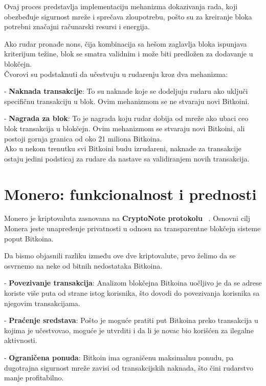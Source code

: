 \documentclass[12pt,a4paper]{article}
\begin{document}
Ovaj proces predstavlja implementaciju mehanizma dokazivanja rada, koji obezbeđuje sigurnost mreže i sprečava zloupotrebu, pošto su za kreiranje bloka potrebni značajni računarski resursi i energija.

Ako rudar pronađe nons, čija kombinacija sa hešom zaglavlja bloka ispunjava kriterijum težine, blok se smatra validnim i može biti predložen za dodavanje u blokčejn.\\

Čvorovi su podstaknuti da učestvuju u rudarenju kroz dva mehanizma:

    -	\textbf{Naknada transakcije}: To su naknade koje se dodeljuju rudaru ako uključi specifičnu transakciju u blok. Ovim mehanizmom se ne stvaraju novi Bitkoini.
    
    -	\textbf{Nagrada za blok}: To je nagrada koju rudar dobija od mreže ako ubaci ceo blok transakcija u blokčejn. Ovim mehanizmom se stvaraju novi Bitkoini, ali postoji gornja granica od oko 21 miliona Bitkoina.\\
    
Ako u nekom trenutku svi Bitkoini budu izrudareni, naknade za transakcije ostaju jedini podsticaj za rudare da nastave sa validiranjem novih transakcija.


\newpage
\section{Monero: funkcionalnost i prednosti}
Monero je kriptovaluta zasnovana na \textbf{CryptoNote protokolu} ~\cite{cryptonote}. Osnovni cilj Monera jeste unapređenje privatnosti u odnosu na transparentne blokčejn sisteme poput Bitkoina. 

Da bismo objasnili razliku između ove dve kriptovalute, prvo želimo da se osvrnemo na neke od bitnih nedostataka Bitkoina.

    -	\textbf{Povezivanje transakcija}: Analizom blokčejna Bitkoina uočljivo je da se adrese koriste više puta od strane istog korisnika, što dovodi do povezivanja korisnika sa njegovim transakcijama.
    
    -	\textbf{Praćenje sredstava}: Pošto je moguće pratiti put Bitkoina preko transakcija u kojima je učestvovao, moguće je utvrditi i da li je novac bio korišćen za ilegalne aktivnosti. 
    
    -	\textbf{Ograničena ponuda}: Bitkoin ima ograničenu maksimalnu ponudu, pa dugotrajna sigurnost mreže zavisi od transakcijskih naknada, što čini rudarstvo manje profitabilno.\\
    
\end{document}
